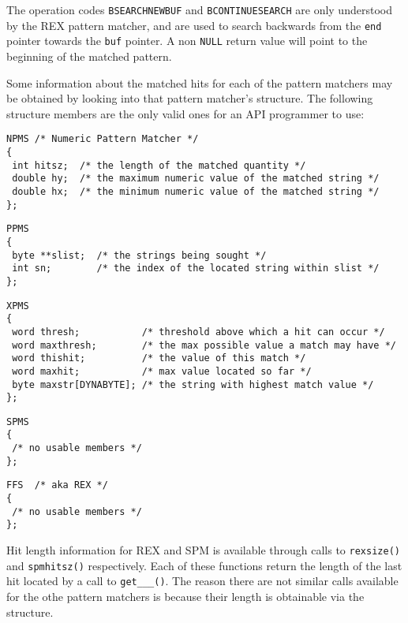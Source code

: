 The operation codes \verb`BSEARCHNEWBUF` and \verb`BCONTINUESEARCH` are
only understood by the REX pattern matcher, and are used to search
backwards from the \verb`end` pointer towards the \verb`buf` pointer.  A
non \verb`NULL` return value will point to the beginning of the matched
pattern.

Some information about the matched hits for each of the pattern matchers
may be obtained by looking into that pattern matcher's structure. The
following structure members are the only valid ones for an API programmer
to use:

\begin{verbatim}
NPMS /* Numeric Pattern Matcher */
{
 int hitsz;  /* the length of the matched quantity */
 double hy;  /* the maximum numeric value of the matched string */
 double hx;  /* the minimum numeric value of the matched string */
};
\end{verbatim}

\begin{verbatim}
PPMS
{
 byte **slist;  /* the strings being sought */
 int sn;        /* the index of the located string within slist */
};
\end{verbatim}

\begin{verbatim}
XPMS
{
 word thresh;           /* threshold above which a hit can occur */
 word maxthresh;        /* the max possible value a match may have */
 word thishit;          /* the value of this match */
 word maxhit;           /* max value located so far */
 byte maxstr[DYNABYTE]; /* the string with highest match value */
};
\end{verbatim}

\begin{verbatim}
SPMS
{
 /* no usable members */
};
\end{verbatim}

\begin{verbatim}
FFS  /* aka REX */
{
 /* no usable members */
};
\end{verbatim}

Hit length information for REX and SPM is available through calls to
\verb`rexsize()` and \verb`spmhitsz()` respectively.  Each of these
functions return the length of the last hit located by a call to
\verb`get___()`.  The reason there are not similar calls available for the
othe pattern matchers is because their length is obtainable via the
structure.

